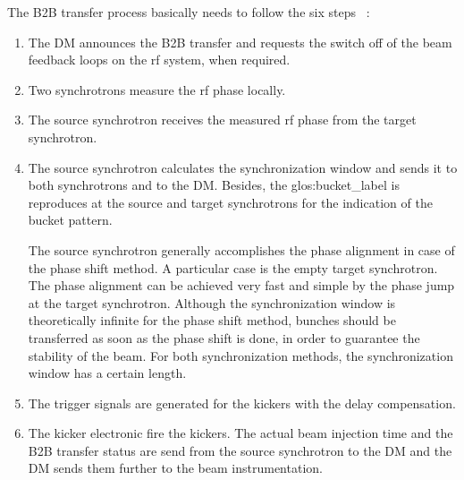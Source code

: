 The B2B transfer process basically needs to follow the six steps ~\cite{bai_bunch_2015}:
\begin{enumerate}
\item The DM announces the B2B transfer and requests the switch off of the beam feedback loops on the rf system, when required.
\item Two synchrotrons measure the rf phase locally.
\item The source synchrotron receives the measured rf phase from the target synchrotron.
\item The source synchrotron calculates the synchronization window and sends it to both synchrotrons and to the DM. Besides, the \gls{glos:bucket_label} is reproduces at the source and target synchrotrons for the indication of the bucket pattern.

The source synchrotron generally accomplishes the phase alignment in case of the phase shift method. A particular case is the empty target synchrotron. The phase alignment can be achieved very fast and simple by the phase jump at the target synchrotron. Although the synchronization window is theoretically infinite for the phase shift method, bunches should be transferred as soon as the phase shift is done, in order to guarantee the stability of the beam. For both synchronization methods, the synchronization window has a certain length.

\item The trigger signals are generated for the kickers with the delay compensation.
\item The kicker electronic fire the kickers. The actual beam injection time and the B2B transfer status are send from the source synchrotron to the DM and the DM sends them further to the beam instrumentation.

\end{enumerate}



